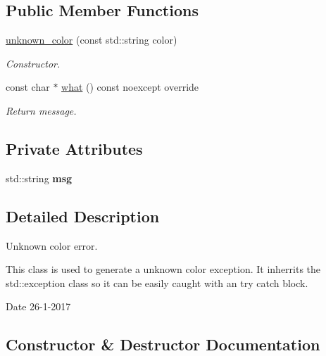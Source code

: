 \subsection*{Public Member Functions}
\begin{DoxyCompactItemize}
\item 
\hyperlink{classunknown__color_aef7c5513b511dd59ba1a3a58798966d3}{unknown\+\_\+color} (const std\+::string color)
\begin{DoxyCompactList}\small\item\em Constructor. \end{DoxyCompactList}\item 
const char $\ast$ \hyperlink{classunknown__color_a3340e3af5b5f734727b73ddf25df3265}{what} () const noexcept override
\begin{DoxyCompactList}\small\item\em Return message. \end{DoxyCompactList}\end{DoxyCompactItemize}
\subsection*{Private Attributes}
\begin{DoxyCompactItemize}
\item 
\mbox{\label{classunknown__color_a17bf517ff68841e8aac49dd58035c6a7}} 
std\+::string {\bfseries msg}
\end{DoxyCompactItemize}


\subsection{Detailed Description}
Unknown color error. 

This class is used to generate a unknown color exception. It inherrits the std\+::exception class so it can be easily caught with an try catch block.

\begin{DoxyDate}{Date}
26-\/1-\/2017 
\end{DoxyDate}


\subsection{Constructor \& Destructor Documentation}
\mbox{\label{classunknown__color_aef7c5513b511dd59ba1a3a58798966d3}} 
